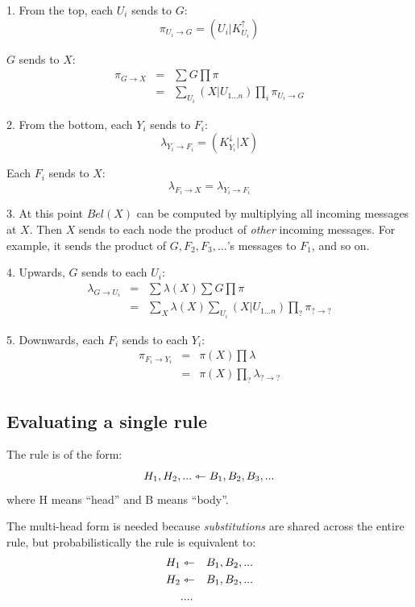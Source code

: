 1. From the top, each $U_i$ sends to $G$:
\begin{equation}
\pi_{U_i \rightarrow G} = (U_i | K^\uparrow_{U_i})
\end{equation}

\tab $G$ sends to $X$:
\begin{eqnarray}
\pi_{G \rightarrow X} &=& \sum G \prod \pi                 \nonumber \\
                      &=& \sum_{U_i} (X|U_{1...n}) \prod_i \pi_{U_i \rightarrow G}
\end{eqnarray}

2. From the bottom, each $Y_i$ sends to $F_i$:
\begin{equation}
\lambda_{Y_i \rightarrow F_i} = (K^\downarrow_{Y_i} | X)
\end{equation}

\tab Each $F_i$ sends to $X$:
\begin{equation}
\lambda_{F_i \rightarrow X} = \lambda_{Y_i \rightarrow F_i}
\end{equation}

3. At this point $Bel(X)$ can be computed by multiplying all incoming messages at $X$.  Then $X$
 sends to each node the product of \textit{other} incoming messages.  For example,
 it sends the product of $G, F_2, F_3, ...$'s messages to $F_1$, and so on.

4. Upwards, $G$ sends to each $U_i$:
\begin{eqnarray}
\lambda_{G \rightarrow U_i} &=& \sum \lambda(X) \sum G \prod \pi             \nonumber \\
  &=& \sum_X \lambda(X) \sum_{U_i} (X|U_{1...n}) \prod_? \pi_{? \rightarrow ?}
\end{eqnarray}

5. Downwards, each $F_i$ sends to each $Y_i$:
\begin{eqnarray}
\pi_{F_i \rightarrow Y_i} &=& \pi(X) \prod \lambda                           \nonumber \\
 &=&  \pi(X) \prod_? \lambda_{? \rightarrow ?}
\end{eqnarray}

\subsection{Evaluating a single rule}

The rule is of the form:
$$ H_1, H_2, ... \leftarrowtriangle B_1, B_2, B_3, ... \nonumber $$
where H means ``head'' and B means ``body''.

The multi-head form is needed because \textit{substitutions} are shared across the entire rule,
 but probabilistically the rule is equivalent to:
\begin{eqnarray}
H_1 &\leftarrowtriangle& B_1, B_2, ... \nonumber \\
H_2 &\leftarrowtriangle& B_1, B_2, ... \nonumber \\
    &....&                 \nonumber
\end{eqnarray}

